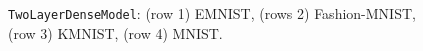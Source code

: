 \documentclass[a4paper,10pt,onecolumn]{article}
\begin{document}
\begin{figure}[b]
\begin{subfigure}[b]{0.5\columnwidth}
  \end{subfigure}
  \caption{%
    \texttt{TwoLayerDenseModel}: (row 1) EMNIST, (rows 2) Fashion-MNIST, (row 3) KMNIST, (row 4) MNIST.
  }
\end{figure}
\end{document}
